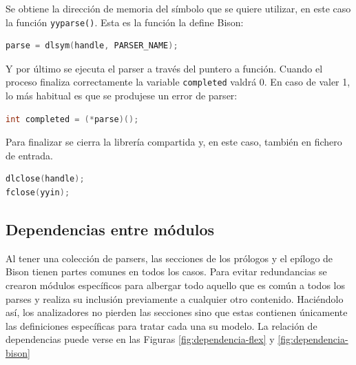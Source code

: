 Se obtiene la dirección de memoria del símbolo que se quiere utilizar, en este caso la función \verb|yyparse()|. Esta es la función la define Bison:

\begin{lstlisting}[language=C,caption={},label={}]
parse = dlsym(handle, PARSER_NAME);
\end{lstlisting}

Y por último se ejecuta el parser a través del puntero a función. Cuando el proceso finaliza correctamente la variable \verb|completed| valdrá 0. En caso de valer 1, lo más habitual es que se produjese un error de parser:

\begin{lstlisting}[language=C,caption={},label={}]
int completed = (*parse)();
\end{lstlisting}

Para finalizar se cierra la librería compartida y, en este caso, también en fichero de entrada.

\begin{lstlisting}[language=C,caption={},label={}]
dlclose(handle);
fclose(yyin);
\end{lstlisting}

\subsection{Dependencias entre módulos}

Al tener una colección de parsers, las secciones de los prólogos y el epílogo de Bison tienen partes comunes en todos los casos. Para evitar redundancias se crearon módulos específicos para albergar todo aquello que es común a todos los parses y realiza su inclusión previamente a cualquier otro contenido. Haciéndolo así, los analizadores no pierden las secciones sino que estas contienen únicamente las definiciones específicas para tratar cada una su modelo. La relación de dependencias puede verse en las Figuras \ref{fig:dependencia-flex} y \ref{fig:dependencia-bison}

